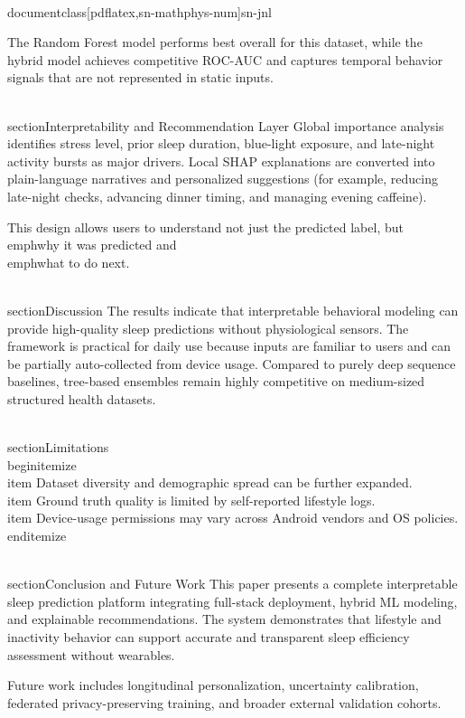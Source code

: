 \\documentclass[pdflatex,sn-mathphys-num]{sn-jnl}
\begin{document}
The Random Forest model performs best overall for this dataset, while the hybrid model achieves competitive ROC-AUC and captures temporal behavior signals that are not represented in static inputs.

\\section{Interpretability and Recommendation Layer}
Global importance analysis identifies stress level, prior sleep duration, blue-light exposure, and late-night activity bursts as major drivers. Local SHAP explanations are converted into plain-language narratives and personalized suggestions (for example, reducing late-night checks, advancing dinner timing, and managing evening caffeine).

This design allows users to understand not just the predicted label, but \\emph{why} it was predicted and \\emph{what to do next}.

\\section{Discussion}
The results indicate that interpretable behavioral modeling can provide high-quality sleep predictions without physiological sensors. The framework is practical for daily use because inputs are familiar to users and can be partially auto-collected from device usage. Compared to purely deep sequence baselines, tree-based ensembles remain highly competitive on medium-sized structured health datasets.

\\section{Limitations}
\\begin{itemize}
    \\item Dataset diversity and demographic spread can be further expanded.
    \\item Ground truth quality is limited by self-reported lifestyle logs.
    \\item Device-usage permissions may vary across Android vendors and OS policies.
\\end{itemize}

\\section{Conclusion and Future Work}
This paper presents a complete interpretable sleep prediction platform integrating full-stack deployment, hybrid ML modeling, and explainable recommendations. The system demonstrates that lifestyle and inactivity behavior can support accurate and transparent sleep efficiency assessment without wearables.

Future work includes longitudinal personalization, uncertainty calibration, federated privacy-preserving training, and broader external validation cohorts.
\end{document}
